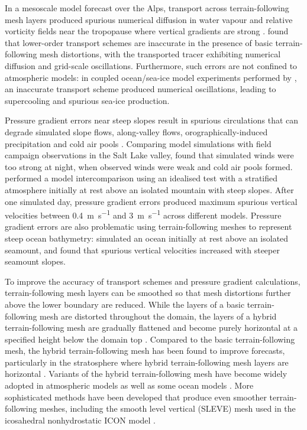 In a mesoscale model forecast over the Alps, transport across terrain-following mesh layers produced spurious numerical diffusion in water vapour and relative vorticity fields near the tropopause where vertical gradients are strong \citep{hoinka-zaengl2004}.
\citet{schaer2002} found that lower-order transport schemes are inaccurate in the presence of basic terrain-following mesh distortions, with the transported tracer exhibiting numerical diffusion and grid-scale oscillations.
Furthermore, such errors are not confined to atmospheric models: in coupled ocean/sea-ice model experiments performed by \citet{naughten2017}, an inaccurate transport scheme produced numerical oscillations, leading to supercooling and spurious sea-ice production.

Pressure gradient errors near steep slopes result in spurious circulations that can degrade simulated slope flows, along-valley flows, orographically-induced precipitation and cold air pools \citep{zaengl2004a}.
Comparing model simulations with field campaign observations in the Salt Lake valley, \citet{fast2003} found that simulated winds were too strong at night, when observed winds were weak and cold air pools formed.
\citet{zaengl2004a} performed a model intercomparison using an idealised test with a stratified atmosphere initially at rest above an isolated mountain with steep slopes.
After one simulated day, pressure gradient errors produced maximum spurious vertical velocities between \SI{0.4}{\meter\per\second} and \SI{3}{\meter\per\second} across different models.
Pressure gradient errors are also problematic using terrain-following meshes to represent steep ocean bathymetry:  
\citet{luo2002} simulated an ocean initially at rest above an isolated seamount, and found that spurious vertical velocities increased with steeper seamount slopes.

To improve the accuracy of transport schemes and pressure gradient calculations, terrain-following mesh layers can be smoothed so that mesh distortions further above the lower boundary are reduced.
While the layers of a basic terrain-following mesh are distorted throughout the domain, the layers of a hybrid terrain-following mesh are gradually flattened and become purely horizontal at a specified height below the domain top \citep{simmons-burridge1981}.
Compared to the basic terrain-following mesh, the hybrid terrain-following mesh has been found to improve forecasts, particularly in the stratosphere where hybrid terrain-following mesh layers are horizontal \citep{eckermann2014}.
Variants of the hybrid terrain-following mesh have become widely adopted in atmospheric models \citep{davies2005,donner2011} as well as some ocean models \citep{burchard-petersen1997,halliwell2004}.
More sophisticated methods have been developed that produce even smoother terrain-following meshes, including the smooth level vertical (SLEVE) mesh \citep{schaer2002,leuenberger2010} used in the icosahedral nonhydrostatic ICON model \citep{zaengl2015}.

